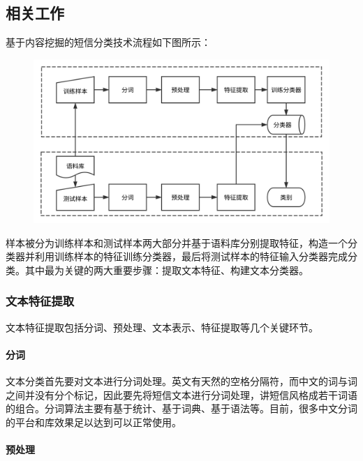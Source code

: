 \subsection{相关工作}\label{ux76f8ux5173ux5de5ux4f5c}

基于内容挖掘的短信分类技术流程如下图所示：

\begin{figure}[htbp]
\centering
\includegraphics{./images/text_classfication.svg}
\caption{}
\end{figure}

样本被分为训练样本和测试样本两大部分并基于语料库分别提取特征，构造一个分类器并利用训练样本的特征训练分类器，最后将测试样本的特征输入分类器完成分类。其中最为关键的两大重要步骤：提取文本特征、构建文本分类器。

\subsubsection{文本特征提取}\label{ux6587ux672cux7279ux5f81ux63d0ux53d6}

文本特征提取包括分词、预处理、文本表示、特征提取等几个关键环节。

\paragraph{分词}\label{ux5206ux8bcd}

文本分类首先要对文本进行分词处理。英文有天然的空格分隔符，而中文的词与词之间并没有分个标记，因此要先将短信文本进行分词处理，讲短信风格成若干词语的组合。分词算法主要有基于统计、基于词典、基于语法等。目前，很多中文分词的平台和库效果足以达到可以正常使用。

\paragraph{预处理}\label{ux9884ux5904ux7406}

